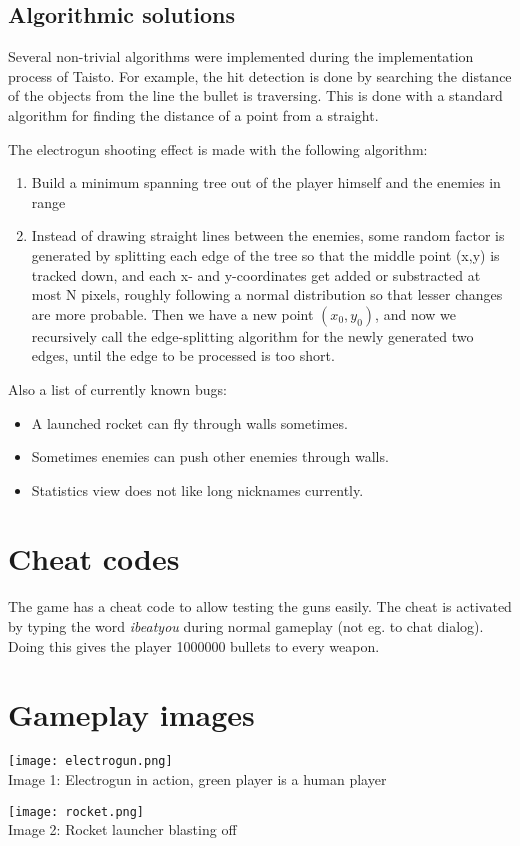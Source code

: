 \documentclass[a4paper,12pt,titlepage]{article}
\begin{document}
\subsection {Algorithmic solutions}
Several non-trivial algorithms were implemented during the implementation 
process of Taisto. For example, the hit detection is done by searching the 
distance of the objects from the line the bullet is traversing. This is done
with a standard algorithm for finding the distance of a point from a straight.

The electrogun shooting effect is made with the following algorithm:
\begin{enumerate}
\item Build a minimum spanning tree out of the player himself and the enemies
in range
\item Instead of drawing straight lines between the enemies, some random factor
is generated by splitting each edge of the tree so that the middle point (x,y)
is tracked down, and each x- and y-coordinates get added or substracted at most
N pixels, roughly following a normal distribution so that lesser changes are
more probable. Then we have a new point $(x_0,y_0)$, and now we recursively
call the edge-splitting algorithm for the newly generated two edges, until the
edge to be processed is too short.
\end{enumerate}

Also a list of currently known bugs:
\begin{itemize}
\item A launched rocket can fly through walls sometimes.
\item Sometimes enemies can push other enemies through walls.
\item Statistics view does not like long nicknames currently.
\end{itemize}


\appendix
\section{Cheat codes}
The game has a cheat code to allow testing the guns easily. The cheat is activated by typing the word \emph{ibeatyou} during normal gameplay (not eg. to chat dialog). Doing this gives the player 1000000 bullets to every weapon.

\section{Gameplay images}
\begin{center}
\texttt{[image: electrogun.png]}
\\
Image 1: Electrogun in action, green player is a human player
\end{center}
\begin{center}
\texttt{[image: rocket.png]}
\\
Image 2: Rocket launcher blasting off
\end{center}
\end{document}

